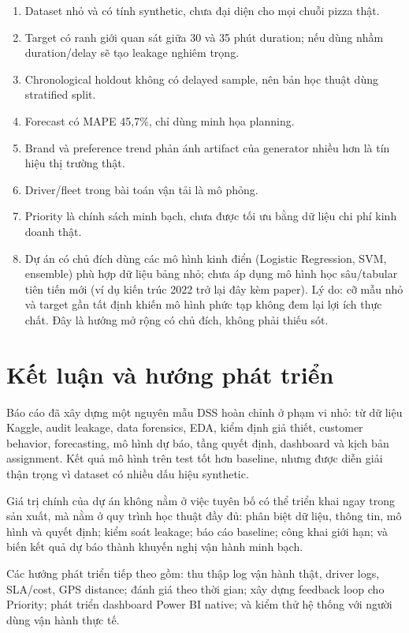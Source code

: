 \documentclass[12pt,a4paper,oneside]{report}
\begin{document}
\begin{enumerate}[leftmargin=*]
  \item Dataset nhỏ và có tính synthetic, chưa đại diện cho mọi chuỗi pizza thật.
  \item Target có ranh giới quan sát giữa 30 và 35 phút duration; nếu dùng nhầm
        duration/delay sẽ tạo leakage nghiêm trọng.
  \item Chronological holdout không có delayed sample, nên bản học thuật dùng
        stratified split.
  \item Forecast có MAPE 45,7\%, chỉ dùng minh họa planning.
  \item Brand và preference trend phản ánh artifact của generator nhiều hơn là
        tín hiệu thị trường thật.
  \item Driver/fleet trong bài toán vận tải là mô phỏng.
  \item Priority là chính sách minh bạch, chưa được tối ưu bằng dữ liệu chi phí
        kinh doanh thật.
  \item Dự án có chủ đích dùng các mô hình kinh điển (Logistic Regression, SVM,
        ensemble) phù hợp dữ liệu bảng nhỏ; chưa áp dụng mô hình học sâu/tabular
        tiên tiến mới (ví dụ kiến trúc 2022 trở lại đây kèm paper). Lý do: cỡ mẫu
        nhỏ và target gần tất định khiến mô hình phức tạp không đem lại lợi ích
        thực chất. Đây là hướng mở rộng có chủ đích, không phải thiếu sót.
\end{enumerate}

\chapter{Kết luận và hướng phát triển}

Báo cáo đã xây dựng một nguyên mẫu DSS hoàn chỉnh ở phạm vi nhỏ: từ dữ liệu
Kaggle, audit leakage, data forensics, EDA, kiểm định giả thiết, customer
behavior, forecasting, mô hình dự báo, tầng quyết định, dashboard và kịch bản
assignment. Kết quả mô hình trên test tốt hơn baseline, nhưng được diễn giải
thận trọng vì dataset có nhiều dấu hiệu synthetic.

Giá trị chính của dự án không nằm ở việc tuyên bố có thể triển khai ngay trong
sản xuất, mà nằm ở quy trình học thuật đầy đủ: phân biệt dữ liệu, thông tin,
mô hình và quyết định; kiểm soát leakage; báo cáo baseline; công khai giới hạn;
và biến kết quả dự báo thành khuyến nghị vận hành minh bạch.

Các hướng phát triển tiếp theo gồm: thu thập log vận hành thật, driver logs,
SLA/cost, GPS distance; đánh giá theo thời gian; xây dựng feedback loop cho
Priority; phát triển dashboard Power BI native; và kiểm thử hệ thống với người
dùng vận hành thực tế.
\end{document}
